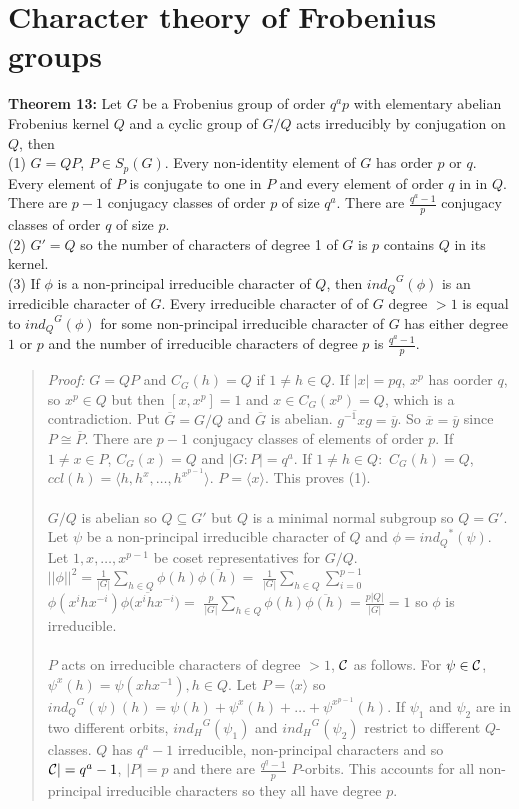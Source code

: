 \section {Character theory of Frobenius groups}
{\bf Theorem 13:} 
Let $G$ be a Frobenius group of order $q^ap$ with elementary abelian Frobenius kernel $Q$ and a cyclic
group of $G/Q$ acts irreducibly by conjugation on $Q$, then
\\
(1) $G=QP$, $P \in S_p(G)$.  Every non-identity element of $G$ has order $p$ or $q$.  Every element of $P$ is conjugate to one in
$P$ and every element of order $q$ in in $Q$.  There are $p-1$ conjugacy classes of order $p$ of size $q^a$.
There are ${\frac {q^a-1} p}$ conjugacy classes of order $q$ of size $p$.
\\
(2) $G' = Q$ so the number of characters of degree 1 of $G$ is $p$ contains $Q$ in its kernel.
\\
(3) If $\phi$ is a non-principal irreducible character of $Q$, then ${ind_Q}^G(\phi)$ is an irredicible character of
$G$.  Every irreducible character of of $G$ degree $>1$ is equal to  ${ind_Q}^G(\phi)$ for some non-principal
irreducible character of $G$ has either degree $1$ or $p$ and the number of irreducible characters of
degree $p$ is ${\frac {q^a - 1} p}$.
\begin{quote}
\emph{Proof:}
$G=QP$ and $C_G(h)= Q$ if $1 \ne h \in Q$.  If $|x|=pq$, $x^p$ has oorder $q$, so $x^p \in Q$ but then $[x, x^p]=1$ and
$x \in C_G(x^p)= Q$, which is a contradiction. Put ${\overline G} = G/Q$ and ${\overline G}$ is abelian.
${\overline {g^{-1}xg}} = {\overline y}$. So ${\overline x} = {\overline y}$ since $P \cong {\overline P}$.
There are $p-1$ conjugacy classes of elements of order $p$.  If $1 \ne x \in P$, $C_G(x)=Q$ and $|G:P| = q^a$.
If $1 \ne h \in Q:$ $C_G(h)=Q$, $ccl(h) = \langle h, h^x, \ldots , h^{x^{p-1}} \rangle$.  $P = \langle x \rangle$.
This proves (1).
\\
\\
$G/Q$ is abelian so $Q \subseteq G'$ but $Q$ is a minimal normal subgroup so $Q=G'$.  Let $\psi$ be a non-principal irreducible
character of $Q$ and $\phi = {ind_Q}^*(\psi)$.  Let $1, x, \ldots, x^{p-1}$ be coset representatives for $G/Q$.
$||\phi||^2 = {\frac 1 {|G|}} \sum_{h \in Q} \phi(h) {\overline {\phi(h)}}=$
${\frac 1 {|G|}} \sum_{h \in Q} \sum_{i=0}^{p-1} $ $\phi(x^i h x^{-i}) {\overline {\phi(x^i h x^{-i}})} =$
${\frac p {|G|}} \sum_{h \in Q} \phi(h) {\overline {\phi(h)}}= {\frac {p|Q|} {|G|}} = 1$ so $\phi$ is irreducible.
\\
\\
$P$ acts on irreducible characters of degree $>1$, ${\cal C}$ as follows.  For $\psi \in {\cal C}$,
$\psi^x(h) = \psi(xhx^{-1}), h \in Q$.  Let $P= \langle x \rangle$ so ${ind_Q}^G(\psi)(h) = \psi(h) + \psi^x(h) + \ldots + \psi^{x^{p-1}}(h)$.
If $\psi_1$ and $\psi_2$ are in two different orbits, ${ind_H}^G(\psi_1)$ and ${ind_H}^G(\psi_2)$ restrict to different $Q$-classes.
$Q$ has $q^a-1$ irreducible, non-principal characters and so ${\cal C}|= q^a-1$, $|P|=p$ and there are ${\frac {q^q-1} p}$ $P$-orbits.
This accounts for all non-principal irreducible characters so they all have degree $p$.
\end{quote}
